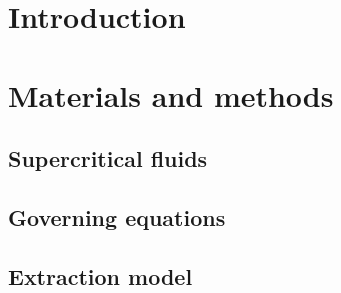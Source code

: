 \documentclass[a4paper,fleqn]{cas-dc}
\begin{document}

\section{Introduction}
%





\section{Materials and methods} \label{CH: Materials and methods}

\subsection{Supercritical fluids} \label{CH: Thermodynamic}
%


%

\subsection{Governing equations} \label{CH:Governing_equations_chapter}


\subsection{Extraction model} \label{CH: Extraction_model}

\end{document}
